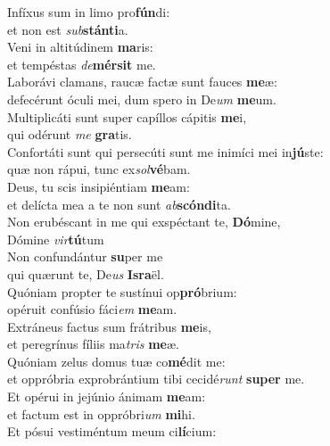 \evenverse Infíxus sum in limo pro\textbf{fún}di:~\*\\
\evenverse et non est \textit{sub}\textbf{stán}\textbf{ti}a.\\
\oddverse Veni in altitúdinem \textbf{ma}ris:~\*\\
\oddverse et tempéstas \textit{de}\textbf{mér}\textbf{sit} me.\\
\evenverse Laborávi clamans, raucæ factæ sunt fauces \textbf{me}æ:~\*\\
\evenverse defecérunt óculi mei, dum spero in De\textit{um} \textbf{me}um.\\
\oddverse Multiplicáti sunt super capíllos cápitis \textbf{me}i,~\*\\
\oddverse qui odérunt \textit{me} \textbf{gra}tis.\\
\evenverse Confortáti sunt qui persecúti sunt me inimíci mei in\textbf{jú}ste:~\*\\
\evenverse quæ non rápui, tunc ex\textit{sol}\textbf{vé}bam.\\
\oddverse Deus, tu scis insipiéntiam \textbf{me}am:~\*\\
\oddverse et delícta mea a te non sunt \textit{ab}\textbf{scón}\textbf{di}ta.\\
\evenverse Non erubéscant in me qui exspéctant te, \textbf{Dó}mine,~\*\\
\evenverse Dómine \textit{vir}\textbf{tú}tum\\
\oddverse Non confundántur \textbf{su}per me~\*\\
\oddverse qui quærunt te, De\textit{us} \textbf{Is}\textbf{ra}ël.\\
\evenverse Quóniam propter te sustínui op\textbf{pró}brium:~\*\\
\evenverse opéruit confúsio fáci\textit{em} \textbf{me}am.\\
\oddverse Extráneus factus sum frátribus \textbf{me}is,~\*\\
\oddverse et peregrínus fíliis ma\textit{tris} \textbf{me}æ.\\
\evenverse Quóniam zelus domus tuæ co\textbf{mé}dit me:~\*\\
\evenverse et oppróbria exprobrántium tibi cecidé\textit{runt} \textbf{su}\textbf{per} me.\\
\oddverse Et opérui in jejúnio ánimam \textbf{me}am:~\*\\
\oddverse et factum est in oppróbri\textit{um} \textbf{mi}hi.\\
\evenverse Et pósui vestiméntum meum ci\textbf{lí}cium:~\*\\
